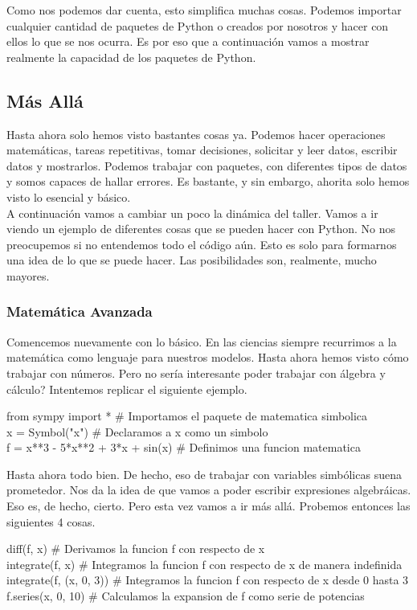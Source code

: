 \documentclass[10pt,letterpaper]{article}
\newenvironment{Code}
{
\begin{lrbox}{\selvestebox}%
\begin{minipage}{\dimexpr\columnwidth-2\fboxsep\relax}
\fontfamily{\ttdefault}\selectfont
}
{\end{minipage}\end{lrbox}%
\begin{center}
\colorbox{light-gray}{\usebox{\selvestebox}}
\end{center}
}
\begin{document}
Como nos podemos dar cuenta, esto simplifica muchas cosas. Podemos importar cualquier cantidad de paquetes de Python o creados por nosotros y hacer con ellos lo que se nos ocurra. Es por eso que a continuaci\'on vamos a mostrar realmente la capacidad de los paquetes de Python.

\subsection{M\'as All\'a}
Hasta ahora solo hemos visto bastantes cosas ya. Podemos hacer operaciones matem\'aticas, tareas repetitivas, tomar decisiones, solicitar y leer datos, escribir datos y mostrarlos. Podemos trabajar con paquetes, con diferentes tipos de datos y somos capaces de hallar errores. Es bastante, y sin embargo, ahorita solo hemos visto lo esencial y b\'asico.\\

A continuaci\'on vamos a cambiar un poco la din\'amica del taller. Vamos a ir viendo un ejemplo de diferentes cosas que se pueden hacer con Python. No nos preocupemos si no entendemos todo el c\'odigo a\'un. Esto es solo para formarnos una idea de lo que se puede hacer. Las posibilidades son, realmente, mucho mayores.

\subsubsection{Matem\'atica Avanzada}
Comencemos nuevamente con lo b\'asico. En las ciencias siempre recurrimos a la matem\'atica como lenguaje para nuestros modelos. Hasta ahora hemos visto c\'omo trabajar con n\'umeros. Pero no ser\'ia interesante poder trabajar con \'algebra y c\'alculo? Intentemos replicar el siguiente ejemplo.

\begin{Code}
from sympy import * \# Importamos el paquete de matematica simbolica\\
x = Symbol("x") \# Declaramos a x como un simbolo\\
f = x**3 - 5*x**2 + 3*x + sin(x) \# Definimos una funcion matematica
\end{Code}

Hasta ahora todo bien. De hecho, eso de trabajar con variables simb\'olicas suena prometedor. Nos da la idea de que vamos a poder escribir expresiones algebr\'aicas. Eso es, de hecho, cierto. Pero esta vez vamos a ir m\'as all\'a. Probemos entonces las siguientes 4 cosas.

\begin{Code}
diff(f, x) \# Derivamos la funcion f con respecto de x\\
integrate(f, x) \# Integramos la funcion f con respecto de x de manera indefinida\\
integrate(f, (x, 0, 3)) \# Integramos la funcion f con respecto de x desde 0 hasta 3\\
f.series(x, 0, 10) \# Calculamos la expansion de f como serie de potencias
\end{Code}
\end{document}
